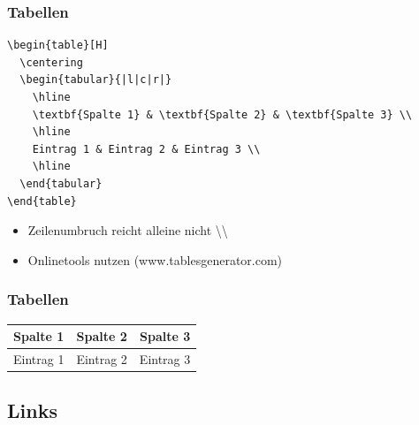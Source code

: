 \documentclass[aspectratio=169]{beamer}
\begin{document}
\begin{frame}[fragile]
\frametitle{Tabellen}

\begin{lstlisting}[language={[latex]TeX}]
\begin{table}[H] 
  \centering
  \begin{tabular}{|l|c|r|} 
    \hline
    \textbf{Spalte 1} & \textbf{Spalte 2} & \textbf{Spalte 3} \\ 
    \hline
    Eintrag 1 & Eintrag 2 & Eintrag 3 \\ 
    \hline
  \end{tabular}
\end{table}
\end{lstlisting}

\vspace{1em}

\begin{itemize}
  \item Zeilenumbruch reicht alleine nicht \textbackslash\textbackslash 
  \item Onlinetools nutzen (www.tablesgenerator.com)
\end{itemize}

\end{frame}

\begin{frame}[fragile]
  \frametitle{Tabellen}
  \begin{table}[H] 
    \centering
    \begin{tabular}{|l|c|r|} 
      \hline
      \textbf{Spalte 1} & \textbf{Spalte 2} & \textbf{Spalte 3} \\ 
      \hline
      Eintrag 1 & Eintrag 2 & Eintrag 3 \\ 
      \hline
    \end{tabular}
  \end{table}
\end{frame}


\subsection{Links}
\end{document}
